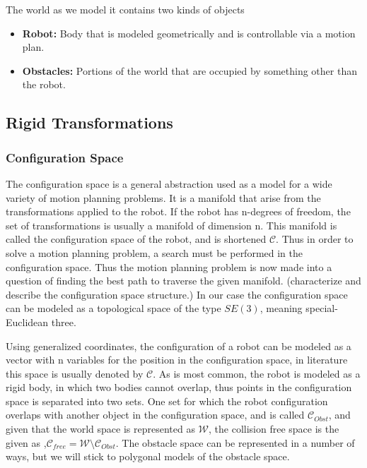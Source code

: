 The world as we model it contains two kinds of objects

\begin{itemize}
\item \textbf{Robot:} Body that is modeled geometrically and is controllable via
  a motion plan.
\item \textbf{Obstacles:} Portions of the world that are occupied by something
  other than the robot.
\end{itemize}

\subsection{Rigid Transformations}
\label{sec:rigidtransformations}



\subsubsection{Configuration Space}
\label{sec:configuration-space}
The configuration space is a general abstraction used as a model for a wide
variety of motion planning problems. It is a manifold that arise from the
transformations applied to the robot. If the robot has n-degrees of freedom, the
set of transformations is usually a manifold of dimension n. This manifold is
called the configuration space of the robot, and is shortened \(\mathcal{C}\).
Thus in order to solve a motion planning problem, a search must be performed in
the configuration space. Thus the motion planning problem is now made into a
question of finding the best path to traverse the given manifold\cite{Lav06}. (characterize and describe the
configuration space structure.)
In our case the configuration space can be modeled as a topological space of
the type \(SE(3)\), meaning special-Euclidean three.

Using generalized coordinates, the configuration of a robot can be modeled as a
vector with n variables for the position in the configuration space, in
literature this space is usually denoted by \(\mathcal{C}\). As is most common,
the robot is modeled as a rigid body, in which two bodies cannot overlap, thus
points in the configuration space is separated into two sets. One set for which
the robot configuration overlaps with another object in the configuration space,
and is called \(\mathcal{C}_{Obst}\), and given that the world space is
represented as \(\mathcal{W}\), the collision free space is the given as
,\(\mathcal{C}_{free} = \mathcal{W}\setminus \mathcal{C}_{Obst}\). The
obstacle space can be represented in a number of ways, but we will stick to
polygonal models of the obstacle space.

